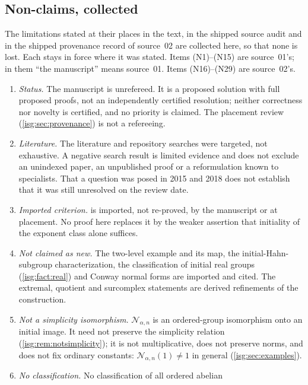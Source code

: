 \documentclass[11pt]{article}
\theoremstyle{definition}
\theoremstyle{remark}
\newcommand{\Rect}{\mathcal{N}_{\alpha,n}}
\begin{document}
\subsection{Non-claims, collected}\label{isg:sec:nonclaims}
The limitations stated at their places in the text, in the shipped
source audit and in the shipped provenance record of source~02 are
collected here, so that none is lost. Each stays in force where it was
stated. Items \textup{(N1)}--\textup{(N15)} are source~01's; in them
``the manuscript'' means source~01. Items \textup{(N16)}--\textup{(N29)}
are source~02's.
\begin{enumerate}[label=\textup{(N\arabic*)},leftmargin=*]
\item \emph{Status.} The manuscript is unrefereed. It is a proposed
      solution with full proposed proofs, not an independently certified
      resolution; neither correctness nor novelty is certified, and no
      priority is claimed. The placement review
      (\cref{isg:sec:provenance}) is not a refereeing.
\item \emph{Literature.} The literature and repository searches were
      targeted, not exhaustive. A negative search result is limited
      evidence and does not exclude an unindexed paper, an unpublished
      proof or a reformulation known to specialists. That a question was
      posed in 2015 and 2018 does not establish that it was still
      unresolved on the review date.
\item \emph{Imported criterion.}  is imported, not
      re-proved, by the manuscript or at placement. No proof here
      replaces it by the weaker assertion that initiality of the exponent
      class alone suffices.
\item \emph{Not claimed as new.} The two-level example and its map,
      the initial-Hahn-subgroup characterization, the classification of
      initial real groups (\cref{isg:fact:real}) and Conway normal forms
      are imported and cited. The extremal, quotient and surcomplex
      statements are derived refinements of the construction.
\item \emph{Not a simplicity isomorphism.} $\Rect$ is an ordered-group
      isomorphism onto an initial image. It need not preserve the
      simplicity relation (\cref{isg:rem:notsimplicity}); it is not
      multiplicative, does not preserve norms, and does not fix ordinary
      constants: $\Rect(1)\ne1$ in general (\cref{isg:sec:examples}).
\item \emph{No classification.} No classification of all ordered abelian

\end{enumerate}
\end{document}
